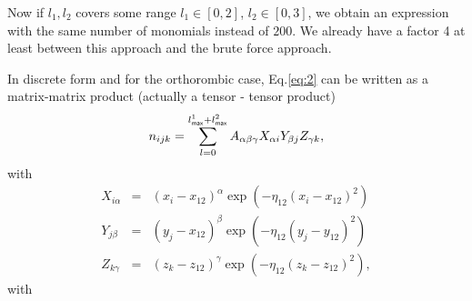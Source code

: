 \documentclass[prb]{revtex4}
\begin{document}
Now if $l_1, l_2$ covers some range $l_1\in \left[0, 2\right]$, $l_2\in \left[0,
  3\right]$, we obtain an expression with the same number of monomials instead
of $200$. We already have a factor 4 at least between this approach and the
brute force approach.

In discrete form and for the orthorombic case, Eq.\ref{eq:2} can be written as a
matrix-matrix product (actually a tensor - tensor product)
\begin{equation}
  \label{eq:collocate:5}
  n_{ijk} = \sum_{l = 0}^{l^1_{\sf max} + l^2_{\sf max}}  A_{\alpha\beta\gamma} X_{\alpha i} Y_{\beta j} Z_{\gamma k},
\end{equation}
with
\begin{eqnarray}
  \label{eq:collocate:6a}
  X_{i\alpha} &=& (x_i - x_{12})^\alpha \exp(-\eta_{12} (x_i-x_{12})^2)\\
  \label{eq:collocate:6b}
  Y_{j\beta} &=& (y_j - x_{12})^\beta \exp(-\eta_{12} (y_j - y_{12})^2)\\
  \label{eq:collocate:6c}
  Z_{k\gamma} &=& (z_k - z_{12})^\gamma \exp(-\eta_{12} (z_k-z_{12})^2),
\end{eqnarray}
with
\end{document}
